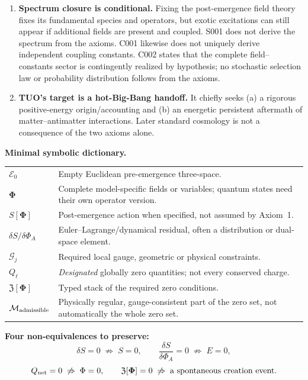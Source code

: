 \documentclass[11pt,a4paper]{article}
\newcommand{\cZ}{\mathfrak Z}
\newcommand{\cE}{\mathcal E}
\newcommand{\cG}{\mathcal G}
\newcommand{\cM}{\mathcal M}
\theoremstyle{tmon}
\theoremstyle{definition}
\begin{document}
\begin{enumerate}[label=\textbf{R\arabic*.}]
\item \textbf{Spectrum closure is conditional.} Fixing the post-emergence field theory fixes its fundamental species and operators, but exotic excitations can still appear if additional fields are present and coupled. S001 does not derive the spectrum from the axioms. C001 likewise does not uniquely derive independent coupling constants. C002 states that the complete field--constants sector is contingently realized by hypothesis; no stochastic selection law or probability distribution follows from the axioms.
\item \textbf{TUO's target is a hot-Big-Bang handoff.} It chiefly seeks (a) a rigorous positive-energy origin/accounting and (b) an energetic persistent aftermath of matter--antimatter interactions. Later standard cosmology is not a consequence of the two axioms alone.
\end{enumerate}

\textbf{Minimal symbolic dictionary.}
\begin{center}\small
\begin{tabularx}{\linewidth}{@{}p{.22\linewidth}Y@{}}\toprule
$\cE_0$ & Empty Euclidean pre-emergence three-space.\\
$\bm\Phi$ & Complete model-specific fields or variables; quantum states need their own operator version.\\
$S[\bm\Phi]$ & Post-emergence action when specified, not assumed by Axiom~1.\\
$\delta S/\delta\Phi_A$ & Euler--Lagrange/dynamical residual, often a distribution or dual-space element.\\
$\cG_j$ & Required local gauge, geometric or physical constraints.\\
$Q_\ell$ & \emph{Designated} globally zero quantities; not every conserved charge.\\
$\cZ[\bm\Phi]$ & Typed stack of the required zero conditions.\\
$\cM_{\rm admissible}$ & Physically regular, gauge-consistent part of the zero set, not automatically the whole zero set.\\\bottomrule
\end{tabularx}
\end{center}

\textbf{Four non-equivalences to preserve:}
\begin{equation*}
\delta S=0\;\not\Rightarrow\;S=0,\qquad
\frac{\delta S}{\delta\Phi_A}=0\;\not\Rightarrow\;E=0,
\end{equation*}
\begin{equation*}
Q_{\rm net}=0\;\not\Rightarrow\;\Phi=0,\qquad
\cZ[\bm\Phi]=0\;\not\Rightarrow\;\text{a spontaneous creation event}.
\end{equation*}
\end{document}
